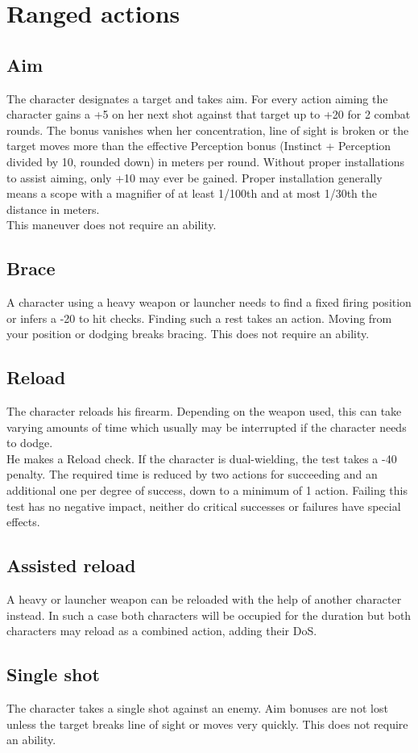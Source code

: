 \section{Ranged actions}
\subsection*{Aim}
The character designates a target and takes aim. For every action aiming the character gains a +5 on her next shot against that target up to +20 for 2 combat rounds. The bonus vanishes when her concentration, line of sight is broken or the target moves more than the effective Perception bonus (Instinct + Perception divided by 10, rounded down) in meters per round. Without proper installations to assist aiming, only +10 may ever be gained. Proper installation generally means a scope with a magnifier of at least 1/100th and at most 1/30th the distance in meters.\\
This maneuver does not require an ability.
\subsection*{Brace}
A character using a heavy weapon or launcher needs to find a fixed firing position or infers a -20 to hit checks. Finding such a rest takes an action. Moving from your position or dodging breaks bracing. This does not require an ability.
\subsection*{Reload}
The character reloads his firearm. Depending on the weapon used, this can take varying amounts of time which usually may be interrupted if the character needs to dodge.\\
He makes a Reload check. If the character is dual-wielding, the test takes a -40 penalty. The required time is reduced by two actions for succeeding and an additional one per degree of success, down to a minimum of 1 action. Failing this test has no negative impact, neither do critical successes or failures have special effects.
\subsection*{Assisted reload}
A heavy or launcher weapon can be reloaded with the help of another character instead. In such a case both characters will be occupied for the duration but both characters may reload as a combined action, adding their DoS.
\subsection*{Single shot}
The character takes a single shot against an enemy. Aim bonuses are not lost unless the target breaks line of sight or moves very quickly. This does not require an ability.
